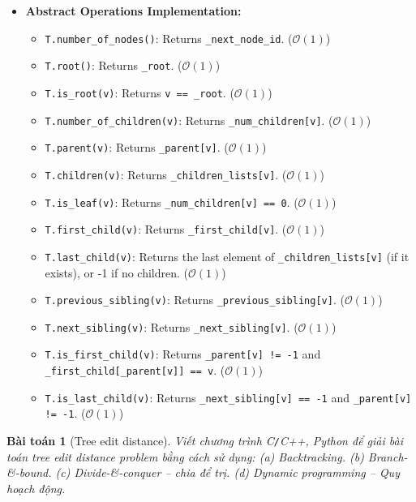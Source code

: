 \documentclass{article}
\newtheorem{baitoan}{Bài toán}
\begin{document}
\begin{itemize}
    \item \textbf{Abstract Operations Implementation:}
    \begin{itemize}
        \item \texttt{T.number\_of\_nodes()}: Returns \texttt{\_next\_node\_id}. ($\mathcal{O}(1)$)
        \item \texttt{T.root()}: Returns \texttt{\_root}. ($\mathcal{O}(1)$)
        \item \texttt{T.is\_root(v)}: Returns \texttt{v == \_root}. ($\mathcal{O}(1)$)
        \item \texttt{T.number\_of\_children(v)}: Returns \texttt{\_num\_children[v]}. ($\mathcal{O}(1)$)
        \item \texttt{T.parent(v)}: Returns \texttt{\_parent[v]}. ($\mathcal{O}(1)$)
        \item \texttt{T.children(v)}: Returns \texttt{\_children\_lists[v]}. ($\mathcal{O}(1)$)
        \item \texttt{T.is\_leaf(v)}: Returns \texttt{\_num\_children[v] == 0}. ($\mathcal{O}(1)$)
        \item \texttt{T.first\_child(v)}: Returns \texttt{\_first\_child[v]}. ($\mathcal{O}(1)$)
        \item \texttt{T.last\_child(v)}: Returns the last element of \texttt{\_children\_lists[v]} (if it exists), or -1 if no children. ($\mathcal{O}(1)$)
        \item \texttt{T.previous\_sibling(v)}: Returns \texttt{\_previous\_sibling[v]}. ($\mathcal{O}(1)$)
        \item \texttt{T.next\_sibling(v)}: Returns \texttt{\_next\_sibling[v]}. ($\mathcal{O}(1)$)
        \item \texttt{T.is\_first\_child(v)}: Returns \texttt{\_parent[v] != -1} and \texttt{\_first\_child[\_parent[v]] == v}. ($\mathcal{O}(1)$)
        \item \texttt{T.is\_last\_child(v)}: Returns \texttt{\_next\_sibling[v] == -1} and \texttt{\_parent[v] != -1}. ($\mathcal{O}(1)$)
    \end{itemize}
\end{itemize}

\begin{baitoan}[Tree edit distance]
    Viết chương trình {\sf C{\tt/}C++, Python} để giải bài toán tree edit distance problem bằng cách sử dụng: (a) Backtracking. (b) Branch-\&-bound. (c) Divide-\&-conquer -- chia để trị. (d) Dynamic programming -- Quy hoạch động.
\end{baitoan}
\end{document}
